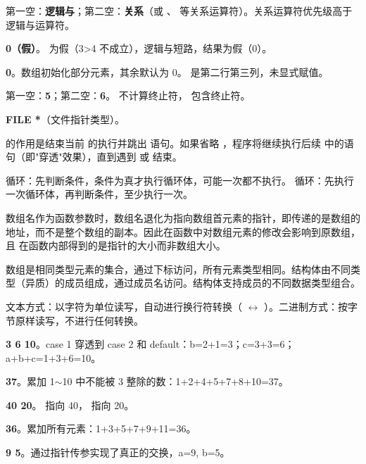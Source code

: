 \documentclass[a4paper,11pt]{article}
\begin{document}
\examtitle



\q 第一空：\textbf{逻辑与}；第二空：\textbf{关系}（或 \code{==}、\code{!=} 等关系运算符）。关系运算符优先级高于逻辑与运算符。

\q \textbf{0（假）}。 为假（3>4 不成立），逻辑与短路，结果为假（0）。

\q \textbf{0}。数组初始化部分元素，其余默认为 0。 是第二行第三列，未显式赋值。

\q 第一空：\textbf{5}；第二空：\textbf{6}。 不计算终止符， 包含终止符。

\q \textbf{FILE *}（文件指针类型）。


\q {} 的作用是结束当前  的执行并跳出  语句。如果省略 ，程序将继续执行后续  中的语句（即"穿透"效果），直到遇到  或  结束。

\q {} 循环：先判断条件，条件为真才执行循环体，可能一次都不执行。 循环：先执行一次循环体，再判断条件，至少执行一次。

\q 数组名作为函数参数时，数组名退化为指向数组首元素的指针，即传递的是数组的地址，而不是整个数组的副本。因此在函数中对数组元素的修改会影响到原数组，且  在函数内部得到的是指针的大小而非数组大小。

\q 数组是相同类型元素的集合，通过下标访问，所有元素类型相同。结构体由不同类型（异质）的成员组成，通过成员名访问。结构体支持成员的不同数据类型组合。

\q 文本方式：以字符为单位读写，自动进行换行符转换（ $\leftrightarrow$ ）。二进制方式：按字节原样读写，不进行任何转换。


\q \textbf{3 6 10}。case 1 穿透到 case 2 和 default：b=2+1=3；c=3+3=6；a+b+c=1+3+6=10。

\q \textbf{37}。累加 1$\sim$10 中不能被 3 整除的数：1+2+4+5+7+8+10=37。

\q \textbf{40 20}。 指向 40， 指向 20。

\q \textbf{36}。累加所有元素：1+3+5+7+9+11=36。

\q \textbf{9 5}。通过指针传参实现了真正的交换，a=9, b=5。
\end{document}
